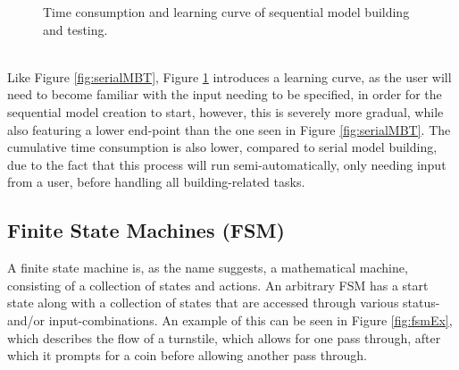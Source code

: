 \begin{description}
\begin{figure}[h]
		\caption{Time consumption and learning curve of sequential model building and testing.}
		\label{fig:sequenceMBT}
	\end{figure}\\
	Like Figure \ref{fig:serialMBT}, Figure \ref{fig:sequenceMBT} introduces a learning curve, as the user will need to become familiar with the input needing to be specified, in order for the sequential model creation to start, however, this is severely more gradual, while also featuring a lower end-point than the one seen in Figure \ref{fig:serialMBT}. The cumulative time consumption is also lower, compared to serial model building, due to the fact that this process will run semi-automatically, only needing input from a user, before handling all building-related tasks.
\end{description}
\newpage
\subsection{Finite State Machines (FSM)}
A finite state machine is, as the name suggests, a mathematical machine, consisting of a collection of states and actions. An arbitrary FSM has a start state along with a collection of states that are accessed through various status- and/or input-combinations. An example of this can be seen in Figure \ref{fig:fsmEx}, which describes the flow of a turnstile, which allows for one pass through, after which it prompts for a coin before allowing another pass through.

